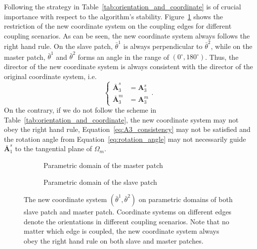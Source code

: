 \begin{remark}
	Following the strategy in Table~\ref{tab:orientation_and_coordinate} is of crucial importance with respect to the algorithm's stability. Figure~\ref{fig:parametric_of_slave_master} shows the restriction of the new coordinate system on the coupling edges for different coupling scenarios. As can be seen, the new coordinate system always follows the right hand rule. On the slave patch, $\bar{\theta}^1$ is always perpendicular to $\bar{\theta}^2$, while on the master patch, $\bar{\theta}^1$ and $\bar{\theta}^2$ forms an angle in the range of $(0^{\circ}, 180^{\circ})$. Thus, the director of the new coordinate system is always consistent with the director of the original coordinate system, i.e.
	\begin{equation}
		\left\{
		\begin{split}
			\bar{\mathbf{A}}^s_3 &= {\mathbf{A}}^s_3\\
			\bar{\mathbf{A}}^m_3 &= {\mathbf{A}}^m_3
		\end{split}
		\right..\label{eq:A3_consistency}
	\end{equation}
	On the contrary, if we do not follow the scheme in Table~\ref{tab:orientation_and_coordinate}, the new coordinate system may not obey the right hand rule, Equation~\eqref{eq:A3_consistency} may not be satisfied and the rotation angle from Equation~\eqref{eq:rotation_angle} may not necessarily guide $\bar{\mathbf{A}}^s_1$ to the tangential plane of $\Omega_m$.
\end{remark}

\begin{figure}[ht]
	\centering
	\begin{subfigure}[b]{0.47\textwidth}
		\centering
		
		\caption{Parametric domain of the master patch}
	\end{subfigure}
	\begin{subfigure}[b]{0.47\textwidth}
		\centering
		
		\caption{Parametric domain of the slave patch}
	\end{subfigure}
	\caption{The new coordinate system $(\bar{\theta}^1, \bar{\theta}^2)$ on parametric domains of both slave patch and master patch. Coordinate systems on different edges denote the orientations in different coupling scenarios. Note that no matter which edge is coupled, the new coordinate system always obey the right hand rule on both slave and master patches.}
	\label{fig:parametric_of_slave_master}
\end{figure}

